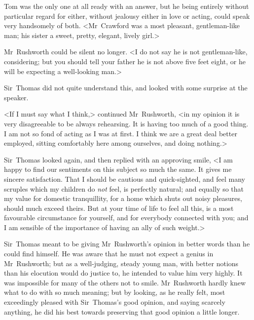 Tom was the only one at all ready with an answer, but he being entirely without particular regard for either, without jealousy either in love or acting, could speak very handsomely of both. <Mr~Crawford was a most pleasant, gentleman-like man; his sister a sweet, pretty, elegant, lively girl.>

Mr~Rushworth could be silent no longer. <I do not say he is not gentleman-like, considering; but you should tell your father he is not above five feet eight, or he will be expecting a well-looking man.>

Sir~Thomas did not quite understand this, and looked with some surprise at the speaker.

<If I must say what I think,> continued Mr~Rushworth, <in my opinion it is very disagreeable to be always rehearsing. It is having too much of a good thing. I am not so fond of acting as I was at first. I think we are a great deal better employed, sitting comfortably here among ourselves, and doing nothing.>

Sir~Thomas looked again, and then replied with an approving smile, <I am happy to find our sentiments on this subject so much the same. It gives me sincere satisfaction. That I should be cautious and quick-sighted, and feel many scruples which my children do \textit{not}  feel, is perfectly natural; and equally so that my value for domestic tranquillity, for a home which shuts out noisy pleasures, should much exceed theirs. But at your time of life to feel all this, is a most favourable circumstance for yourself, and for everybody connected with you; and I am sensible of the importance of having an ally of such weight.>

Sir~Thomas meant to be giving Mr~Rushworth's opinion in better words than he could find himself. He was aware that he must not expect a genius in Mr~Rushworth; but as a well-judging, steady young man, with better notions than his elocution would do justice to, he intended to value him very highly. It was impossible for many of the others not to smile. Mr~Rushworth hardly knew what to do with so much meaning; but by looking, as he really felt, most exceedingly pleased with Sir~Thomas's good opinion, and saying scarcely anything, he did his best towards preserving that good opinion a little longer. 